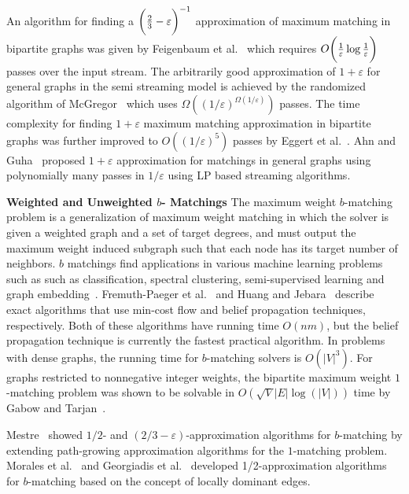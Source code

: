 An algorithm for finding a $\bigg( {2\over3}-\varepsilon \bigg)^{-1}$ approximation of maximum matching in bipartite graphs was given by Feigenbaum et al.~\cite{Feigenbaum05} which requires $O\bigg( {1\over \varepsilon}\log {1\over \varepsilon}\bigg)$ passes over the input stream. The arbitrarily good approximation of $1+\varepsilon$ for general graphs in the semi streaming model is achieved by the randomized algorithm of McGregor~\cite{McGregor05} which uses $\Omega((1/\varepsilon)^{\Omega(1/\varepsilon)})$ passes. The time complexity for finding $1+\varepsilon$ maximum matching approximation in bipartite graphs was further improved to $O((1/\varepsilon)^5)$ passes by Eggert et al.~\cite{EKMS11}. Ahn and Guha~\cite{AG11} proposed $1+\varepsilon$ approximation for matchings in general graphs using polynomially many passes in $1/\varepsilon$ using LP based streaming algorithms.

\textbf{Weighted and Unweighted $b$- Matchings} The maximum weight $b$-matching problem is a
generalization of maximum weight matching in which
the solver is given a weighted graph and a set of target
degrees, and must output the maximum weight
induced subgraph such that each node has its target
number of neighbors. $b$ matchings find applications in various machine learning problems such as such as classification, spectral clustering, semi-supervised learning and graph embedding~\cite{JH}.
 Fremuth-Paeger et al.~\cite{FPCJD}  and Huang and Jebara~\cite{JH} describe exact algorithms that use min-cost flow and belief propagation techniques, respectively. Both of these algorithms have running time $O(nm)$, but the belief propagation technique is currently the fastest practical algorithm.
In problems with dense
graphs, the running time for $b$-matching solvers is $O(|V|^3)$. For graphs restricted to nonnegative integer weights,
the bipartite maximum weight $1$-matching problem
was shown to be solvable in $O(\sqrt{V}|E| \log(|V |))$ time
by Gabow and Tarjan~\cite{GabowTarjan}.

Mestre~\cite{Mestre}  showed $1/2$- and $(2/3 - \varepsilon)$-approximation algorithms for $b$-matching by extending path-growing approximation algorithms for the $1$-matching problem. Morales et al.~\cite{DeFrancisciMorales} and Georgiadis et al.~\cite{GeorgiadisP13} developed 1/2-approximation algorithms for $b$-matching based on the concept of locally dominant edges.

